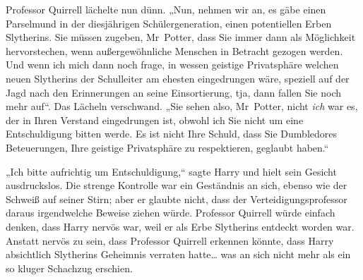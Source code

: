 Professor Quirrell lächelte nun dünn. „Nun, nehmen wir an, es gäbe einen Parselmund in der diesjährigen Schülergeneration, einen potentiellen Erben Slytherins. Sie müssen zugeben, Mr~Potter, dass Sie immer dann als Möglichkeit hervorstechen, wenn außergewöhnliche Menschen in Betracht gezogen werden. Und wenn ich mich dann noch frage, in wessen geistige Privatsphäre welchen neuen Slytherins der Schulleiter am ehesten eingedrungen wäre, speziell auf der Jagd nach den Erinnerungen an seine Einsortierung, tja, dann fallen Sie noch mehr auf“. Das Lächeln verschwand. „Sie sehen also, Mr~Potter, nicht \emph{ich} war es, der in Ihren Verstand eingedrungen ist, obwohl ich Sie nicht um eine Entschuldigung bitten werde. Es ist nicht Ihre Schuld, dass Sie Dumbledores Beteuerungen, Ihre geistige Privatsphäre zu respektieren, geglaubt haben.“

„Ich bitte aufrichtig um Entschuldigung,“ sagte Harry und hielt sein Gesicht ausdruckslos. Die strenge Kontrolle war ein Geständnis an sich, ebenso wie der Schweiß auf seiner Stirn; aber er glaubte nicht, dass der Verteidigungsprofessor daraus irgendwelche Beweise ziehen würde. Professor Quirrell würde einfach denken, dass Harry nervös war, weil er als Erbe Slytherins entdeckt worden war. Anstatt nervös zu sein, dass Professor Quirrell erkennen könnte, dass Harry absichtlich Slytherins Geheimnis verraten hatte… was an sich nicht mehr als ein so kluger Schachzug erschien.

